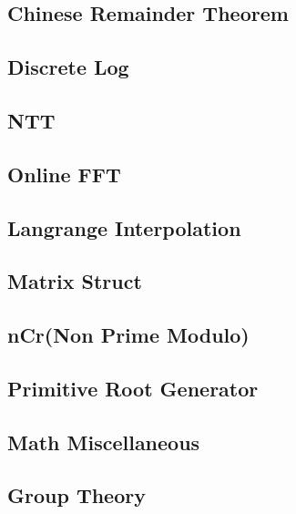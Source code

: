 \subsection{Chinese Remainder Theorem}
\raggedbottom
\subsection{Discrete Log}
\raggedbottom
\subsection{NTT}
\raggedbottom
\subsection{Online FFT}
\raggedbottom
\subsection{Langrange Interpolation}
\raggedbottom
\subsection{Matrix Struct}
\raggedbottom
\subsection{nCr(Non Prime Modulo)}
\raggedbottom
\subsection{Primitive Root Generator}
\raggedbottom
\subsection{Math Miscellaneous}
\raggedbottom
\subsection{Group Theory}
\raggedbottom


